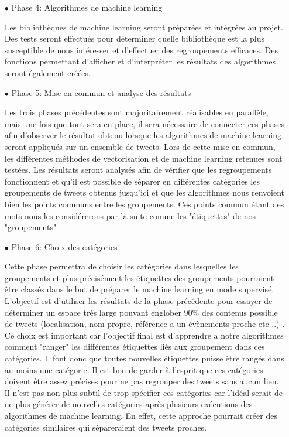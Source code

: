 \documentclass{article}
\begin{document}
\begin{itemize}
\item[$\bullet$]\color{red} Phase 4: Algorithmes de machine learning \color{black}

Les bibliothèques de machine learning seront préparées et intégrées au projet.
Des tests seront effectués pour déterminer quelle bibliothèque est la plus susceptible de nous intéresser et d'effectuer des regroupements efficaces.
Des fonctions permettant d'afficher et d'interpréter les résultats des algorithmes seront également créées. \\

\item[$\bullet$] \color{red}Phase 5: Mise en commun et analyse des résultats\color{black}

Les trois phases précédentes sont majoritairement réalisables en parallèle, mais une fois que tout sera en place, il sera nécessaire de connecter ces phases afin d'observer le résultat obtenu lorsque les algorithmes de machine learning seront appliqués sur un ensemble de tweets.
Lors de cette mise en commun, les différentes méthodes de vectorisation et de machine learning retenues sont testées. 
Les résultats seront analysés afin de vérifier que les regroupements fonctionnent et qu'il est possible de séparer en différentes catégories les groupements de tweets obtenus jusqu'ici et que les algorithmes nous renvoient bien les points communs entre les groupements. 
Ces points commun étant des mots nous les considérerons par la suite comme les "étiquettes" de nos "groupements"\\

\item[$\bullet$] \color{red}Phase 6: Choix des catégories \color{black}

Cette phase permettra de choisir les catégories dans lesquelles les groupements et plus précisément les étiquettes des groupements pourraient être classés dans le but de préparer le machine learning en mode supervisé. 
L'objectif est d'utiliser les résultats de la phase précédente pour essayer de déterminer un espace très large pouvant englober 90\% des contenus possible de tweets (localisation, nom propre, référence a un évènements proche etc ..) . 
Ce choix est important car l'objectif final est d'apprendre a notre algorithmes comment "ranger" les différentes étiquettes liés aux groupement dans ces catégories. 
Il font donc que toutes nouvelles étiquettes puisse être rangés dans au moins une catégorie.
Il est bon de garder à l'esprit que ces catégories doivent être assez précises pour ne pas regrouper des tweets sans aucun lien. 
Il n'est pas non plus subtil de trop spécifier ces catégories car l'idéal serait de ne plus générer de nouvelles catégories après plusieurs exécutions des algorithmes de machine learning. 
En effet, cette approche pourrait créer des catégories similaires qui sépareraient des tweets proches.\\



\end{itemize}
\end{document}
